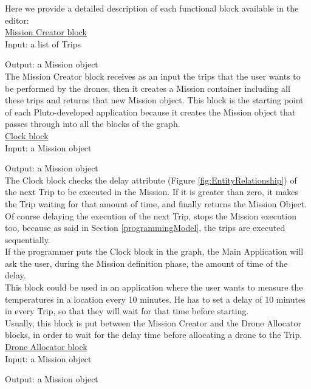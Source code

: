 Here we provide a detailed description of each functional block available in the editor:
\\

\underline{Mission Creator block}
\\

Input: a list of Trips

Output: a Mission object
\\

The Mission Creator block receives as an input the trips that the user wants to be performed by the drones, then it creates a Mission container including all these trips and returns that new Mission object.
This block is the starting point of each Pluto-developed application because it creates the Mission object that passes through into all the blocks of the graph.
\\

\underline{Clock block}
\\

Input: a Mission object

Output: a Mission object
\\

The Clock block checks the delay attribute (Figure \ref{fig:EntityRelationship}) of the next Trip to be executed in the Mission. If it is greater than zero, it makes the Trip waiting for that amount of time, and finally returns the Mission Object. Of course delaying the execution of the next Trip, stops the Mission execution too, because as said in Section \ref{programmingModel}, the trips are executed sequentially.
\\
If the programmer puts the Clock block in the graph, the Main Application will ask the user, during the Mission definition phase, the amount of time of the delay.
\\
This block could be used in an application where the user wants to measure the temperatures in a location every 10 minutes. He has to set a delay of 10 minutes in every Trip, so that they will wait for that time before starting.
\\
Usually, this block is put between the Mission Creator and the Drone Allocator blocks, in order to wait for the delay time before allocating a drone to the Trip.
\\

\underline{Drone Allocator block}
\\

Input: a Mission object

Output: a Mission object
\\

